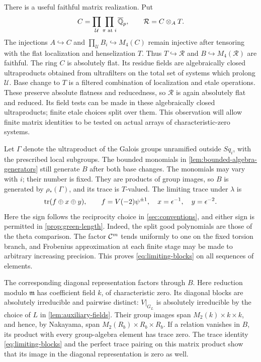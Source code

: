 There is a useful faithful matrix realization.  Put
\begin{equation}
 C=\prod_{\mathcal U}\prod_{\pi\text{ at }i}\overline{\mathbb Q}_p,
 \qquad \mathcal R=C\otimes_A T.
 \label{eq:ambient-ring}
\end{equation}
The injections $A\hookrightarrow C$ and
$\prod_{\mathcal U}B_i\hookrightarrow M_4(C)$ remain injective after
tensoring with the flat localization and henselization $T$.
Thus $T\hookrightarrow\mathcal R$ and
$B\hookrightarrow M_4(\mathcal R)$ are faithful.  The ring $C$ is
absolutely flat.  Its residue fields are algebraically closed
ultraproducts obtained from ultrafilters on the total set of systems
which prolong $\mathcal U$.  Base change to $T$ is a filtered
combination of localization and etale operations.  These preserve
absolute flatness and reducedness, so $\mathcal R$ is again
absolutely flat and reduced.  Its field tests can be made in these
algebraically closed ultraproducts; finite etale choices split over
them.  This observation will allow finite matrix identities to be
tested on actual arrays of characteristic-zero systems.

Let $\Gamma$ denote the ultraproduct of the Galois groups unramified
outside $Sq_i$, with the prescribed local subgroups.  The bounded
monomials in \cref{lem:bounded-algebra-generators} still generate $B$
after both base changes.  The monomials may vary with $i$; their number
is fixed.  They are products of group images, so
$B$ is generated by $\rho_*(\Gamma)$, and its trace is $T$-valued.
The limiting trace under $\lambda$ is
\begin{equation}
  \operatorname{tr}(f\oplus x\oplus y),\qquad
  f=V(-2)\psi^{\pm1},\quad x=\epsilon^{-1},\quad y=\epsilon^{-2}.
 \label{eq:limiting-blocks}
\end{equation}
Here the sign follows the reciprocity choice in
\cref{sec:conventions}, and either sign is permitted in
\cref{prop:green-length}.  Indeed, the split good polynomials are
those of the theta comparison.  The factor $\mathcal C^m$ tends uniformly
to one on the fixed torsion branch, and Frobenius approximation at
each finite stage may be made to arbitrary increasing precision.
This proves \cref{eq:limiting-blocks} on all sequences of elements.

The corresponding diagonal representation factors through $B$.
Here reduction modulo $\mathfrak m$ has coefficient field $k$, of
characteristic zero.  Its diagonal blocks are absolutely irreducible and
pairwise distinct: $V|_{G_L}$ is absolutely irreducible by the choice
of $L$ in \cref{lem:auxiliary-fields}.  Their group images span
$M_2(k)\times k\times k$, and hence, by Nakayama, span
$M_2(R_b)\times R_b\times R_b$.  If a relation vanishes in $B$,
its product with every group-algebra element has trace zero.  The
trace identity \cref{eq:limiting-blocks} and the perfect trace
pairing on this matrix product show that its image in the diagonal
representation is zero as well.

